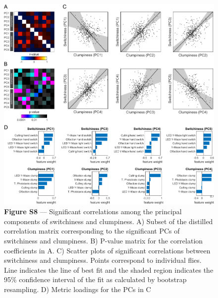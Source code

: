 \documentclass[12pt,letterpaper]{article}
\begin{document}
\begin{figure}[t!]
    \includegraphics[width=\textwidth]{../figures/chapter_3/fig_s8.pdf}
    \vspace{.05in}
    \caption*{\textbf{Figure S8} — Significant correlations among the principal components of switchiness and clumpiness. A) Subset of the distilled correlation matrix corresponding to the significant PCs of switchiness and clumpiness. B) P-value matrix for the correlation coefficients in A. C) Scatter plots of significant correlations between switchiness and clumpiness. Points correspond to individual flies. Line indicates the line of best fit and the shaded region indicates the 95\% confidence interval of the fit as calculated by bootstrap resampling. D) Metric loadings for the PCs in C}
\end{figure}
\clearpage
\end{document}

